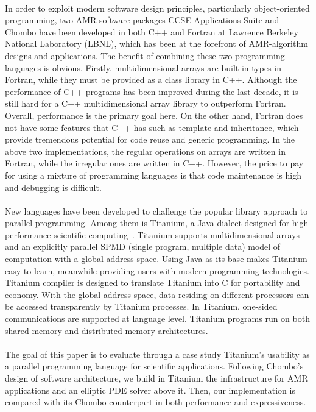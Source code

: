 \documentclass{ieee}
\numberwithin{equation}{section}
\begin{document}
\paragraph{}In order to exploit modern software design principles, particularly object-oriented programming, two AMR software packages  CCSE Applications Suite and Chombo have been developed in both C++ and Fortran at Lawrence Berkeley National Laboratory (LBNL), which has been at the  forefront of AMR-algorithm designs and applications. The benefit of combining these two programming languages is obvious. Firstly, multidimensional arrays are built-in types in Fortran, while they must be provided as a class library in C++. Although the performance of C++ programs has been improved during the last decade, it is still hard for a C++ multidimensional array library to outperform Fortran. Overall, performance is the primary goal here. On the other hand, Fortran does not have some features that C++ has such as template and inheritance, which provide tremendous potential for code reuse and generic programming. In the  above two implementations, the regular operations on arrays are written in Fortran, while the irregular ones are written in C++.  However, the price to pay for using a mixture of programming languages is that code maintenance is high and debugging is difficult. 

\paragraph{}New languages have been developed to challenge the popular library approach to parallel programming. Among them is Titanium, a Java dialect designed for high-performance scientific computing~\cite{TitaniumPaper}. Titanium supports multidimensional arrays and an explicitly parallel SPMD (single program, multiple data) model of computation with a global address space. Using Java as its base makes Titanium easy to learn, meanwhile providing users with modern programming technologies. Titanium compiler is designed to translate Titanium into C for portability and economy.  With the global address space, data residing on different processors can be accessed transparently by Titanium processes. In Titanium, one-sided communications are supported at language level. Titanium programs run on both shared-memory and distributed-memory architectures.

\paragraph{}The goal of this paper is to evaluate through a case study Titanium's usability as a parallel programming language for scientific applications. Following Chombo's design of software architecture, we build in Titanium the infrastructure for AMR applications  and an elliptic PDE solver above it. Then, our implementation is compared with its Chombo counterpart in both performance and expressiveness.
\end{document}
